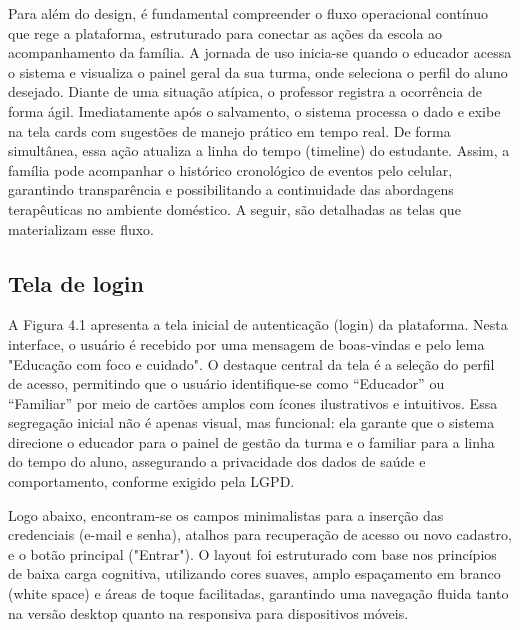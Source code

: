Para além do design, é fundamental compreender o fluxo operacional contínuo que rege a plataforma, estruturado para conectar as ações da escola ao acompanhamento da família. A jornada de uso inicia-se quando o educador acessa o sistema e visualiza o painel geral da sua turma, onde seleciona o perfil do aluno desejado. Diante de uma situação atípica, o professor registra a ocorrência de forma ágil. Imediatamente após o salvamento, o sistema processa o dado e exibe na tela cards com sugestões de manejo prático em tempo real. De forma simultânea, essa ação atualiza a linha do tempo (timeline) do estudante. Assim, a família pode acompanhar o histórico cronológico de eventos pelo celular, garantindo transparência e possibilitando a continuidade das abordagens terapêuticas no ambiente doméstico. A seguir, são detalhadas as telas que materializam esse fluxo.

\vspace{0.5cm}
\subsection{Tela de login}

A Figura 4.1 apresenta a tela inicial de autenticação (login) da plataforma. Nesta interface, o usuário é recebido por uma mensagem de boas-vindas e pelo lema "Educação com foco e cuidado". O destaque central da tela é a seleção do perfil de acesso, permitindo que o usuário identifique-se como “Educador” ou “Familiar” por meio de cartões amplos com ícones ilustrativos e intuitivos. Essa segregação inicial não é apenas visual, mas funcional: ela garante que o sistema direcione o educador para o painel de gestão da turma e o familiar para a linha do tempo do aluno, assegurando a privacidade dos dados de saúde e comportamento, conforme exigido pela LGPD.

Logo abaixo, encontram-se os campos minimalistas para a inserção das credenciais (e-mail e senha), atalhos para recuperação de acesso ou novo cadastro, e o botão principal ("Entrar"). O layout foi estruturado com base nos princípios de baixa carga cognitiva, utilizando cores suaves, amplo espaçamento em branco (white space) e áreas de toque facilitadas, garantindo uma navegação fluida tanto na versão desktop quanto na responsiva para dispositivos móveis.

